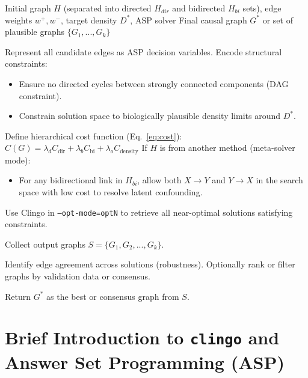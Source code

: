 \begin{algorithm}[H]
\caption{RnR Causal Graph Recovery Algorithm}
\label{alg:rnrcausal}
\begin{algorithmic}[1]
\REQUIRE Initial graph $H$ (separated into directed $H_{dir}$ and bidirected $H_{bi}$ sets), edge weights $w^+, w^-$, target density $D^*$, ASP solver
\ENSURE Final causal graph $G^*$ or set of plausible graphs $\{G_1, ..., G_k\}$

\textbf{ }
\STATE Represent all candidate edges as ASP decision variables.
\STATE Encode structural constraints:
\begin{itemize}
    \item Ensure no directed cycles between strongly connected components (DAG constraint).
    \item Constrain solution space to biologically plausible density limits around $D^*$.
\end{itemize}
\STATE Define hierarchical cost function (Eq.~\ref{eq:cost}): $C(G) = \lambda_d C_{\text{dir}} + \lambda_b C_{\text{bi}} + \lambda_o C_{\text{density}}$
\STATE If $H$ is from another method (meta-solver mode):
\begin{itemize}
    \item For any bidirectional link in $H_{bi}$, allow both $X \rightarrow Y$ and $Y \rightarrow X$ in the search space with low cost to resolve latent confounding.
\end{itemize}

 \textbf{}
\STATE Use Clingo in \texttt{--opt-mode=optN} to retrieve all near-optimal solutions satisfying constraints.

\STATE Collect output graphs $S = \{G_1, G_2, ..., G_k\}$.

\textbf{}
    \STATE Identify edge agreement across solutions (robustness).
    \STATE Optionally rank or filter graphs by validation data or consensus.
\ENDIF

\STATE Return $G^*$ as the best or consensus graph from $S$.

\end{algorithmic}
\end{algorithm}

\section{Brief Introduction to {\tt clingo} and Answer Set Programming (ASP)}
\label{appx:clingo_tutorial}

